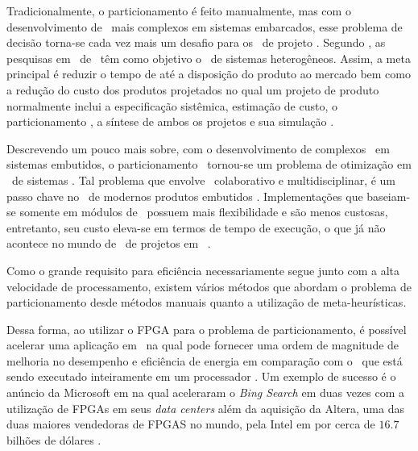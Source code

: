 
	Tradicionalmente, o particionamento é feito manualmente, mas com o desenvolvimento de \designs\ mais complexos em sistemas embarcados, esse problema de decisão torna-se cada vez mais um desafio para os \designers\ de projeto \cite{Trindade2016}.
	Segundo \cite{Edwards1994}, as pesquisas em \codesign\ de \hs\ têm como objetivo o \design\ de sistemas heterogêneos.
	Assim, a meta principal é reduzir o tempo de até a disposição do produto ao mercado bem como a redução do custo dos produtos projetados no qual um projeto de produto normalmente inclui a especificação sistêmica, estimação de custo, o particionamento \hs, a síntese de ambos os projetos e sua simulação \cite{Wolf1994}.


	Descrevendo um pouco mais sobre, com o desenvolvimento de complexos \design\ em sistemas embutidos, o particionamento \hs\ tornou-se um problema de otimização em \codesign\ de sistemas \cite{Yan2017}. Tal problema que envolve \design\ colaborativo e multidisciplinar, é um passo chave no \design\ de modernos produtos embutidos \cite{Trappey2016}. Implementações que baseiam-se somente em módulos de \software\ possuem mais flexibilidade e são menos custosas, entretanto, seu custo eleva-se em termos de tempo de execução, o que já não acontece no mundo de \design\ de projetos em \hardware\ \cite{Zhang2008, Hassine2017, Wolf1994}.

	Como o grande requisito para eficiência necessariamente segue junto com a alta velocidade de processamento, existem vários métodos que abordam o problema de particionamento \cite{Arato2005} desde métodos manuais quanto a utilização de meta-heurísticas.

	Dessa forma, ao utilizar o FPGA para o problema de particionamento, é possível acelerar uma aplicação em \hardware\ na qual pode fornecer uma ordem de magnitude de melhoria no desempenho e eficiência de energia em comparação com o \software\ que está sendo executado inteiramente em um processador \cite{Cong2009, Lo2009, Zhang2008a}. Um exemplo de sucesso é o anúncio da Microsoft em \cite{Putnam2014} na qual aceleraram o \textit{Bing Search} em duas vezes com a utilização de FPGAs em seus \textit{data centers} \cite{Putnam2014} além da aquisição da Altera, uma das duas maiores vendedoras de FPGAS no mundo, pela Intel em \cite{Maan2015} por cerca de $ 16.7 $ bilhões de dólares \cite{Maan2015}.


